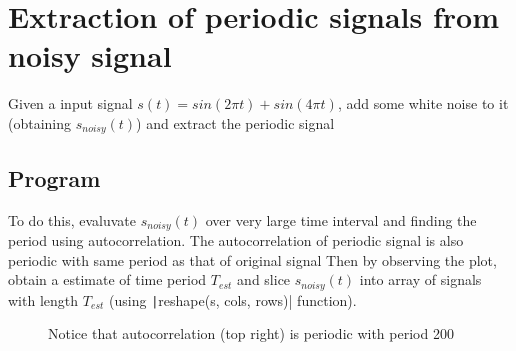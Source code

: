 \section{Extraction of periodic signals from noisy signal}

Given a input signal $s(t) = sin(2\pi t) + sin(4\pi t)$, add some white noise to it (obtaining $s_{noisy}(t)$)
and extract the periodic signal

\subsection*{Program}
To do this, evaluvate $s_{noisy}(t)$ over very large time interval and
finding the period using autocorrelation.
The autocorrelation of periodic signal is also periodic with same period as that of original signal
Then by observing the plot, obtain a estimate of time period $T_{est}$ and
slice $s_{noisy}(t)$ into array of signals with length $T_{est}$ (using \texttt|reshape(s, cols, rows)| function).



\begin{figure*}[ht!]
	\begin{minipage}{.48\textwidth}
	\end{minipage}%
	\hfill%
	\begin{minipage}{.48\textwidth}
	\end{minipage}
	\caption*{Notice that autocorrelation (top right) is periodic with period 200}
\end{figure*}
